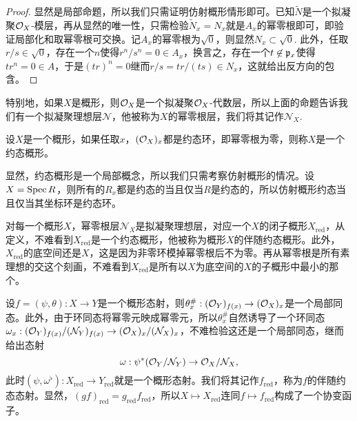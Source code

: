 \begin{proof}
	显然是局部命题，所以我们只需证明仿射概形情形即可。已知$\widetilde{N}$是一个拟凝聚$\mathcal{O}_X$-模层，再从显然的唯一性，只需检验$\widetilde{N}_x=N_x$就是$A_x$的幂零根即可，即验证局部化和取幂零根可交换。记$A_x$的幂零根为$\sqrt{0}$，则显然$N_x\subset \sqrt{0}$. 此外，任取$r/s\in \sqrt{0}$，存在一个$n$使得$r^n/s^n=0\in A_x$，换言之，存在一个$t\not\in \mathfrak{p}_x$使得$tr^n=0\in A$，于是$(tr)^n=0$继而$r/s=tr/(ts)\in N_x$，这就给出反方向的包含。
\end{proof}

\begin{para}[幂零根层]
	特别地，如果$X$是概形，则$\mathcal{O}_X$是一个拟凝聚$\mathcal{O}_X$-代数层，所以上面的命题告诉我们有一个拟凝聚理想层$\mathcal N$，他被称为$X$的幂零根层，我们将其记作$\mathcal N_X$.
\end{para}

\begin{para}[约态概形]
	设$X$是一个概形，如果任取$x$，$(\mathcal{O}_X)_x$都是约态环，即幂零根为零，则称$X$是一个约态概形。
\end{para}

显然，约态概形是一个局部概念，所以我们只需考察仿射概形的情况。设$X=\operatorname{Spec} R$，则所有的$R_x$都是约态的当且仅当$R$是约态的，所以仿射概形约态当且仅当其坐标环是约态环。

对每一个概形$X$，幂零根层$\mathcal N_X$是拟凝聚理想层，对应一个$X$的闭子概形$X_{\text{red}}$，从定义，不难看到$X_{\text{red}}$是一个约态概形，他被称为概形$X$的伴随约态概形。此外，$X_{\text{red}}$的底空间还是$X$，这是因为非零环模掉幂零根后不为零。再从幂零根是所有素理想的交这个刻画，不难看到$X_{\text{red}}$是所有以$X$为底空间的$X$的子概形中最小的那个。

\begin{para}
	设$f=(\psi,\theta):X\to Y$是一个概形态射，则$\theta^\#_x:(\mathcal{O}_Y)_{f(x)}\to (\mathcal{O}_X)_x$是一个局部同态。此外，由于环同态将幂零元映成幂零元，所以$\theta^\#_x$自然诱导了一个环同态$\omega_x:(\mathcal{O}_Y)_{f(x)}/(\mathcal N_Y)_{f(x)}\to (\mathcal{O}_X)_{x}/(\mathcal N_X)_{x}$，不难检验这还是一个局部同态，继而给出态射
	\[
		\omega:\psi^*(\mathcal{O}_Y/\mathcal N_Y)\to \mathcal{O}_X/\mathcal N_X,
	\]
	此时$(\psi,\omega^\flat):X_{\text{red}}\to Y_{\text{red}}$就是一个概形态射。我们将其记作$f_{\text{red}}$，称为$f$的伴随约态态射。显然，$(gf)_{\text{red}}=g_{\text{red}}f_{\text{red}}$，所以$X\mapsto X_{\text{red}}$连同$f\mapsto f_{\text{red}}$构成了一个协变函子。
\end{para}

